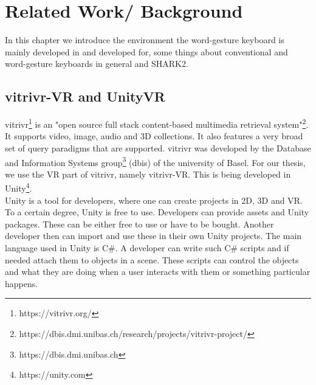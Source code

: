 \chapter{Related Work/ Background}

In this chapter we introduce the environment the word-gesture keyboard is mainly developed in and developed for, some things about conventional and word-gesture keyboards in general and SHARK2.

\section{vitrivr-VR and UnityVR}
vitrivr\footnote{https://vitrivr.org/} is an "open source full stack content-based multimedia retrieval system"\footnote{https://dbis.dmi.unibas.ch/research/projects/vitrivr-project/}. It supports video, image, audio and 3D collections. It also features a very broad set of query paradigms that are supported. vitrivr was developed by the Database and Information Systems group\footnote{https://dbis.dmi.unibas.ch} (dbis) of the university of Basel. For our thesis, we use the VR part of vitrivr, namely vitrivr-VR. This is being developed in Unity\footnote{https://unity.com}.\\
Unity is a tool for developers, where one can create projects in 2D, 3D and VR. To a certain degree, Unity is free to use. Developers can provide assets and Unity packages. These can be either free to use or have to be bought. Another developer then can import and use these in their own Unity projects. The main language used in Unity is C\#. A developer can write such C\# scripts and if needed attach them to objects in a scene. These scripts can control the objects and what they are doing when a user interacts with them or something particular happens. 

